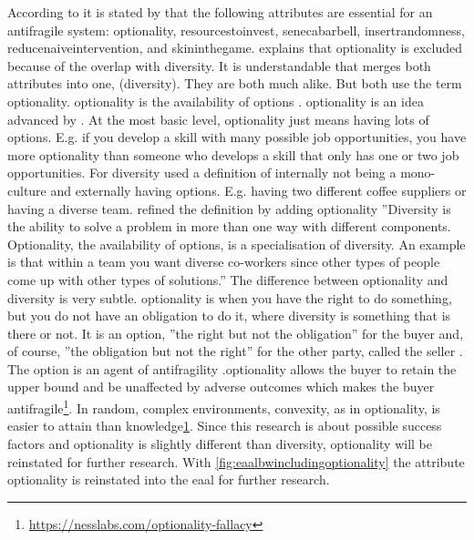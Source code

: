 According to \textcite[p.~64]{Botjes2020} it is stated by \textcite{Taleb2008} that the following attributes are essential for an \gls{antifragile} system: \Gls{optionality}, \Gls{resourcestoinvest}, \Gls{senecabarbell}, \Gls{insertrandomness}, \Gls{reducenaiveintervention}, and \Gls{skininthegame}. \textcite[p.~64]{Botjes2020} explains that \gls{optionality} is excluded because of the overlap with \gls{diversity}. It is understandable that \textcite[p.~66]{Botjes2020} merges both attributes into one, (\gls{diversity}). They are both much alike. But \textcites{Taleb2012}{Gorgeon2015} both use the term \gls{optionality}. \Gls{optionality} is the availability of options \parencites[p.~176--177]{Taleb2012}[p.~9]{Gorgeon2015}. \Gls{optionality} is an idea advanced by \textcite{Taleb2012}. At the most basic level, \gls{optionality} just means having lots of options. E.g. if you develop a skill with many possible job opportunities, you have more \gls{optionality} than someone who develops a skill that only has one or two job opportunities. For \gls{diversity} \textcite{Botjes2020} used a definition of internally not being a mono-culture and externally having options. E.g. having two different coffee suppliers or having a diverse team. \textcite[Table II]{Botjes2021} refined the definition by adding optionality ''Diversity is the ability to solve a problem in more than one way with different components. Optionality, the availability of options, is a specialisation of diversity. An example is that within a team you want diverse co-workers since other types of people come up with other types of solutions.'' The difference between \gls{optionality} and \gls{diversity} is very subtle. \Gls{optionality} is when you have the right to do something, but you do not have an obligation to do it, where diversity is something that is there or not. It is an option, ''the right but not the obligation'' for the buyer and, of course, ''the obligation but not the right'' for the other party, called the seller \parencite[p.~174]{Taleb2012}. The option is an agent of \gls{antifragility} \parencite[p.~174]{Taleb2012}.\Gls{optionality} allows the buyer to retain the upper bound and be unaffected by adverse outcomes which makes the buyer \gls{antifragile}\footnote{\label{foot:nesslabs}\url{https://nesslabs.com/optionality-fallacy}}. In random, complex environments, convexity, as in \gls{optionality}, is easier to attain than knowledge\cref{foot:nesslabs}. Since this research is about possible success factors and \gls{optionality} is slightly different than \gls{diversity}, \gls{optionality} will be reinstated for further research. With \cref{fig:eaalbwincludingoptionality} the attribute \gls{optionality} is reinstated into the \acrlong{eaal} \parencite[Fig.~8]{Botjes2021} for further research.
